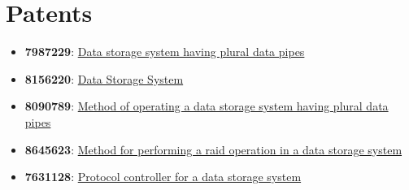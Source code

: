 \documentclass[letterpaper,10pt]{article}
\newcommand{\resumeSubHeadingListStart}{\begin{itemize}[leftmargin=*]}
\newcommand{\resumeSubHeadingListEnd}{\end{itemize}}
\begin{document}
\section{Patents}
 \resumeSubHeadingListStart
   \item{
     \textbf{7987229}{: \href{https://patents.google.com/patent/US7987229B1/en?oq=7987229}{Data storage system having plural data pipes}}
   }\vspace{-7pt}
   \item{
     \textbf{8156220}{: \href{https://patents.google.com/patent/US8156220B1/en?oq=8156220} {Data Storage System}}
   }\vspace{-7pt}
   \item{
     \textbf{8090789}{: \href{https://patents.google.com/patent/US8090789B1/en?oq=8090789} {Method of operating a data storage system having plural data pipes}}
   }\vspace{-7pt}
   \item{
     \textbf{8645623}{: \href{https://patents.google.com/patent/US8645623B1/en?oq=8645623} {Method for performing a raid operation in a data storage system}}
   }
   \vspace{-7pt}
   \item{
     \textbf{7631128}{: \href{https://patents.google.com/patent/US7631128B1/en?oq=7631128} {Protocol controller for a data storage system}}
   }
 \resumeSubHeadingListEnd


\end{document}
